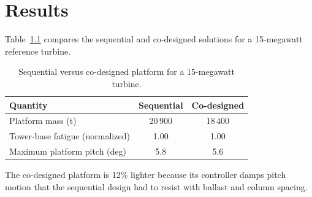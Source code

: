 \chapter{Results}
\label{ch:results}

Table~\ref{tab:designs} compares the sequential and co-designed solutions for a 15-megawatt
reference turbine.

\begin{table}[htbp]
  \centering
  \caption{Sequential versus co-designed platform for a 15-megawatt turbine.}
  \label{tab:designs}
  \begin{tabular}{lcc}
    \toprule
    Quantity & Sequential & Co-designed \\
    \midrule
    Platform mass (t)                 & 20\,900 & 18\,400 \\
    Tower-base fatigue (normalized)   & 1.00 & 1.00 \\
    Maximum platform pitch (deg)      & 5.8 & 5.6 \\
    \bottomrule
  \end{tabular}
\end{table}

The co-designed platform is 12\% lighter because its controller damps pitch motion that the
sequential design had to resist with ballast and column spacing.
